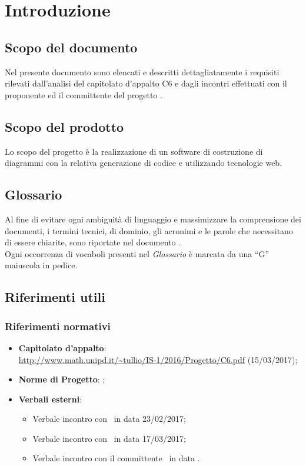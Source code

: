 \documentclass[../AnalisiDeiRequisiti.tex]{subfiles}
\begin{document}
	\section{Introduzione}
		\subsection{Scopo del documento}
			Nel presente documento sono elencati e descritti dettagliatamente i requisiti
			rilevati dall'analisi del capitolato d'appalto C6 e dagli incontri effettuati
			con il proponente ed il committente del progetto \progetto.
		\subsection{Scopo del prodotto}
			Lo scopo del progetto è la realizzazione di un software di
			costruzione di diagrammi  con la relativa generazione
			di codice  e  utilizzando tecnologie
			web.
		\subsection{Glossario}
			Al fine di evitare ogni ambiguità di linguaggio e massimizzare la
			comprensione dei documenti, i termini tecnici, di dominio, gli
			acronimi e le parole che necessitano di essere chiarite, sono
			riportate nel documento \glossariov.\\
			Ogni occorrenza di vocaboli presenti nel \textit{Glossario} è
			marcata da una ``G'' maiuscola in pedice.
		\subsection{Riferimenti utili}
			\subsubsection{Riferimenti normativi}
    			\begin{itemize}
    				\item \textbf{Capitolato d'appalto}:\\
					\url{http://www.math.unipd.it/~tullio/IS-1/2016/Progetto/C6.pdf} (15/03/2017);
					\item \textbf{Norme di Progetto}: \normediprogettov;
    				\item \textbf{Verbali esterni}:
    					\begin{itemize}
    						\item Verbale incontro con \proponente\ in data 23/02/2017;
    						\item Verbale incontro con \proponente\ in data 17/03/2017;
    						\item Verbale incontro con il committente \vardanega\ in data .	%
    					\end{itemize}
				\end{itemize}
\end{document}
